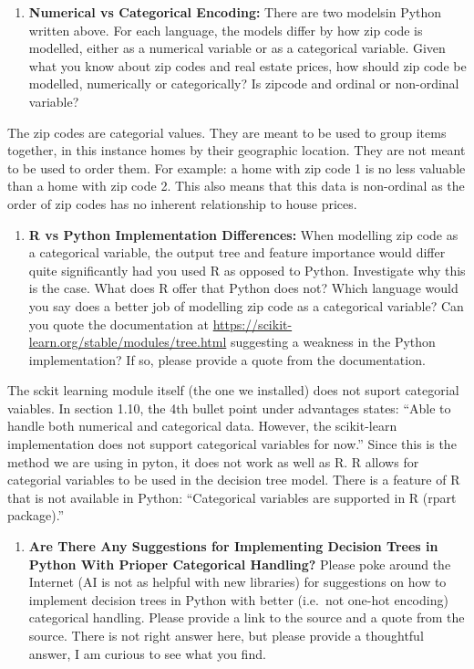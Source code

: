 \documentclass[
  letterpaper,
  DIV=11,
  numbers=noendperiod]{scrartcl}
\providecommand{\tightlist}{%
  \setlength{\itemsep}{0pt}\setlength{\parskip}{0pt}}
\begin{document}
\begin{enumerate}
\def\labelenumi{\arabic{enumi}.}
\tightlist
\item
  \textbf{Numerical vs Categorical Encoding:} There are two modelsin
  Python written above. For each language, the models differ by how zip
  code is modelled, either as a numerical variable or as a categorical
  variable. Given what you know about zip codes and real estate prices,
  how should zip code be modelled, numerically or categorically? Is
  zipcode and ordinal or non-ordinal variable?
\end{enumerate}

The zip codes are categorial values. They are meant to be used to group
items together, in this instance homes by their geographic location.
They are not meant to be used to order them. For example: a home with
zip code 1 is no less valuable than a home with zip code 2. This also
means that this data is non-ordinal as the order of zip codes has no
inherent relationship to house prices.

\begin{enumerate}
\def\labelenumi{\arabic{enumi}.}
\setcounter{enumi}{1}
\tightlist
\item
  \textbf{R vs Python Implementation Differences:} When modelling zip
  code as a categorical variable, the output tree and feature importance
  would differ quite significantly had you used R as opposed to Python.
  Investigate why this is the case. What does R offer that Python does
  not? Which language would you say does a better job of modelling zip
  code as a categorical variable? Can you quote the documentation at
  \url{https://scikit-learn.org/stable/modules/tree.html} suggesting a
  weakness in the Python implementation? If so, please provide a quote
  from the documentation.
\end{enumerate}

The sckit learning module itself (the one we installed) does not suport
categorial vaiables. In section 1.10, the 4th bullet point under
advantages states: ``Able to handle both numerical and categorical data.
However, the scikit-learn implementation does not support categorical
variables for now.'' Since this is the method we are using in pyton, it
does not work as well as R. R allows for categorial variables to be used
in the decision tree model. There is a feature of R that is not
available in Python: ``Categorical variables are supported in R (rpart
package).''

\begin{enumerate}
\def\labelenumi{\arabic{enumi}.}
\setcounter{enumi}{2}
\tightlist
\item
  \textbf{Are There Any Suggestions for Implementing Decision Trees in
  Python With Prioper Categorical Handling?} Please poke around the
  Internet (AI is not as helpful with new libraries) for suggestions on
  how to implement decision trees in Python with better (i.e.~not
  one-hot encoding) categorical handling. Please provide a link to the
  source and a quote from the source. There is not right answer here,
  but please provide a thoughtful answer, I am curious to see what you
  find.
\end{enumerate}
\end{document}
